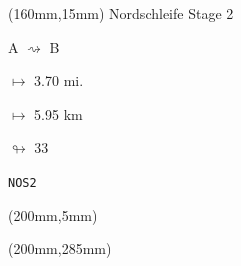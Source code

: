 \begin{textblock*}{40mm}(160mm,15mm)%
Nordschleife Stage 2
\par A $\rightsquigarrow$ B
\Large
\par$\mapsto$ 3.70 mi.
\par$\mapsto$ 5.95 km
\par$\looparrowright$ 33
\par\hfill\tiny\tt NOS2\\
\end{textblock*}
\begin{textblock*}{20mm}(200mm,5mm)%
\fbox{\thepage}
\end{textblock*}
\begin{textblock*}{20mm}(200mm,285mm)%
\fbox{\thepage}
\end{textblock*}
\null\newpage

